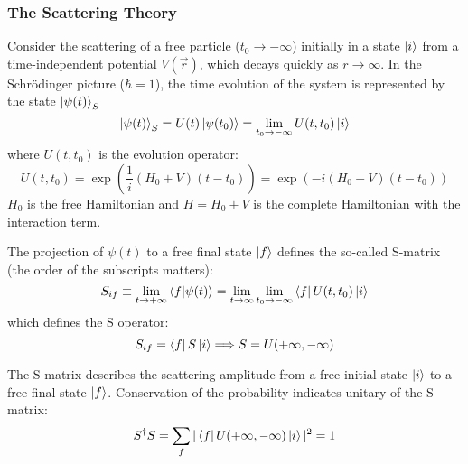 \subsubsection{The Scattering Theory}
Consider the scattering of a free particle ($t_0 \rightarrow -\infty$) initially
in a state $\ket{i}$ from a time-independent potential $V(\vec{r})$, which 
decays quickly as $r \rightarrow \infty$. 
In the Schr\"odinger picture ($\hbar = 1$), the time evolution of the system is
represented by the state $\ket{\psi(t)}_S$ 
\begin{equation}
    \ket{\psi(t)}_S = U(t)\ket{\psi(t_0)} = \lim_{t_0 \rightarrow -\infty}U(t, t_0)\ket{i}
\end{equation}
where $U(t, t_0)$ is the evolution operator:
\begin{equation}
    U(t, t_0) = \exp(\frac{1}{i}(H_0 + V)(t - t_0)) = \exp(-i(H_0 + V)(t-t_0))
\end{equation}
$H_0$ is the free Hamiltonian and $H = H_0 + V$ is the complete Hamiltonian
with the interaction term. 

The projection of $\psi(t)$ to a free final state $\ket{f}$ defines the so-called
S-matrix (the order of the subscripts matters):
\begin{equation}
    S_{if} \equiv \lim_{t\rightarrow +\infty}\bra{f}\ket{\psi(t)} 
    = \lim_{t\rightarrow\infty} \lim_{t_0 \rightarrow -\infty} \bra{f} U(t, t_0) \ket{i}
\end{equation}
which defines the S operator:
\begin{equation}
    S_{if} = \bra{f} S \ket{i} \Longrightarrow S = U(+\infty, -\infty)
\end{equation}

The S-matrix describes the scattering amplitude from a free initial state $\ket{i}$
to a free final state $\ket{f}$. Conservation of the probability indicates
unitary of the S matrix:
\begin{equation}
    S^\dag S = \sum_f |\bra{f} U(+\infty, -\infty) \ket{i}|^2 = 1
\end{equation}

